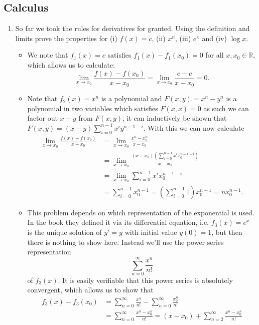 \documentclass{article}
\begin{document}
\subsection{Calculus}
\begin{enumerate} 
\item So far we took the rules for derivatives for granted. Using the definition and limits prove the properties for (i) $f(x) = c$, (ii) $x^n$, (iii) $e^x$ and (iv) $\log x$.
	\begin{itemize}
	\item We note that $f_1(x) = c$ satisfies $f_1(x) - f_1(x_0) = 0$ for all $x, x_0 \in \mathbb{R}$, which allows us to calculate:
	$$
	\lim_{x \rightarrow x_0} \frac{f(x) - f(x_0)}{x - x_0} = \lim_{x \rightarrow x_0} \frac{c - c}{x - x_0} = 0.
	$$
	\item Note that $f_2(x) = x^n$ is a polynomial and $F(x, y) = x^n - y^n$ is a polynomial in two variables which satisfies $F(x, x) = 0$ as such we can factor out $x - y$ from $F(x, y)$, it can inductively be shown that $F(x, y) = (x - y) \sum_{i = 0}^{n - 1} x^i y^{n - 1 - i}$. With this we can now calculate
	\begin{align*}
	\lim_{x \rightarrow x_0} \frac{f(x) - f(x_0)}{x - x_0} &= \lim_{x \rightarrow x_0} \frac{x^n - x_0^n}{x - x_0} \\
	&= \lim_{x \rightarrow x_0} \frac{(x - x_0)\left(\sum_{i = 0}^{n - 1} x^i x_0^{n - 1 - i}\right)}{x - x_0} \\
	&= \lim_{x \rightarrow x_0} \sum_{i = 0}^{n - 1} x^i x_0^{n - 1 - i} \\
	&= \sum_{i = 0}^{n - 1} x_0^{n - 1} = \left(\sum_{i = 0}^{n - 1} 1\right) x_0^{n - 1} = n x_0^{n - 1}.
	\end{align*}
	\item This problem depends on which representation of the exponential is used. In the book they defined it via its differential equation, i.e. $f_3(x) = e^x$ is the unique solution of $y' = y$ with initial value $y(0) = 1$, but then there is nothing to show here. Instead we'll use the power series representation
	$$
	\sum_{n = 0}^\infty \frac{x^n}{n!}
	$$
	of $f_3(x)$. It is easily verifiable that this power series is absolutely convergent, which allows us to show that
	\begin{align*}
	f_3(x) - f_3(x_0) &= \sum_{n = 0}^\infty \frac{x^n}{n!} - \sum_{n = 0}^\infty \frac{x_0^n}{n!} \\
	&= \sum_{n = 0}^\infty \frac{x^n - x_0^n}{n!} = (x - x_0) + \sum_{n = 2}^\infty\frac{x^n - x_0^n}{n!}
	\end{align*}

\end{itemize}
\end{enumerate}
\end{document}
